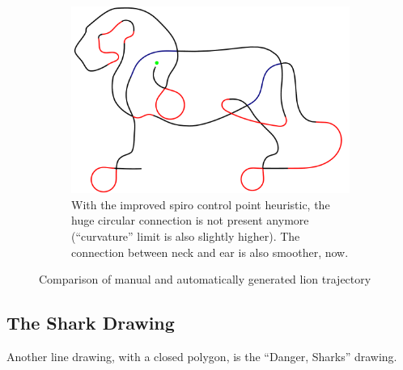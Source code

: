 \begin{figure}[h]
\begin{subfigure}[t]{0.8\textwidth}
	\includegraphics[width=\textwidth]{images/results/lion/lion_new_heuristic2.pdf}
	\caption{With the improved spiro control point heuristic, the huge circular connection is not present anymore (\enquote{curvature} limit is also slightly higher). The connection between neck and ear is also smoother, now.}
\end{subfigure}

\caption{Comparison of manual and automatically generated lion trajectory}
\end{figure}

\clearpage

\subsection{The Shark Drawing}

Another line drawing, with a closed polygon, is the \enquote{Danger, Sharks} drawing.

